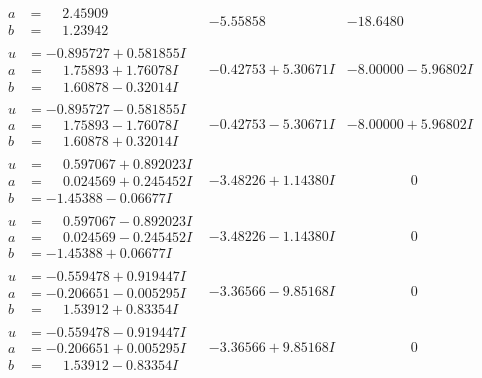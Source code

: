 \documentclass[1p]{elsarticle_modified}
\theoremstyle{definition}
\begin{document}
$$\begin{array}{c|c|c}
\begin{aligned}
a &= \phantom{-}2.45909\phantom{ +0.000000I} \\
b &= \phantom{-}1.23942\phantom{ +0.000000I}\end{aligned}
 & -5.55858\phantom{ +0.000000I} & -18.6480\phantom{ +0.000000I} \\ \hline\begin{aligned}
u &= -0.895727 + 0.581855 I \\
a &= \phantom{-}1.75893 + 1.76078 I \\
b &= \phantom{-}1.60878 - 0.32014 I\end{aligned}
 & -0.42753 + 5.30671 I & -8.00000 - 5.96802 I \\ \hline\begin{aligned}
u &= -0.895727 - 0.581855 I \\
a &= \phantom{-}1.75893 - 1.76078 I \\
b &= \phantom{-}1.60878 + 0.32014 I\end{aligned}
 & -0.42753 - 5.30671 I & -8.00000 + 5.96802 I \\ \hline\begin{aligned}
u &= \phantom{-}0.597067 + 0.892023 I \\
a &= \phantom{-}0.024569 + 0.245452 I \\
b &= -1.45388 - 0.06677 I\end{aligned}
 & -3.48226 + 1.14380 I & \phantom{-0.000000 } 0 \\ \hline\begin{aligned}
u &= \phantom{-}0.597067 - 0.892023 I \\
a &= \phantom{-}0.024569 - 0.245452 I \\
b &= -1.45388 + 0.06677 I\end{aligned}
 & -3.48226 - 1.14380 I & \phantom{-0.000000 } 0 \\ \hline\begin{aligned}
u &= -0.559478 + 0.919447 I \\
a &= -0.206651 - 0.005295 I \\
b &= \phantom{-}1.53912 + 0.83354 I\end{aligned}
 & -3.36566 - 9.85168 I & \phantom{-0.000000 } 0 \\ \hline\begin{aligned}
u &= -0.559478 - 0.919447 I \\
a &= -0.206651 + 0.005295 I \\
b &= \phantom{-}1.53912 - 0.83354 I\end{aligned}
 & -3.36566 + 9.85168 I & \phantom{-0.000000 } 0 \\ \hline\begin{aligned}

\end{aligned}
\end{array}$$
\end{document}
